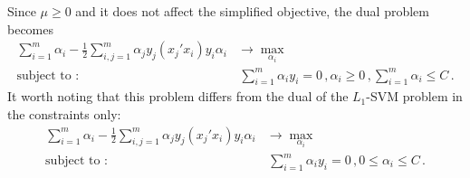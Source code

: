 \documentclass[a4paper]{article}
\begin{document}
Since $\mu \geq 0$ and it does not affect the simplified objective, the dual problem
becomes
\begin{align*}
  \sum_{i=1}^m \alpha_i - \frac{1}{2}
        \sum_{i,j=1}^m \alpha_j y_j (x_j'x_i) y_i \alpha_i
    &\to \max_{\alpha_i} \\
  \text{subject to :}\,
      &\,\sum_{i=1}^m \alpha_i y_i = 0
      \,,\alpha_i \geq 0
      \,,\sum_{i=1}^m \alpha_i \leq C \,.
\end{align*}
It worth noting that this problem differs from the dual of the $L_1$-SVM problem
in the constraints only:
\begin{align*}
  \sum_{i=1}^m \alpha_i - \frac{1}{2}
        \sum_{i,j=1}^m \alpha_j y_j (x_j'x_i) y_i \alpha_i
    &\to \max_{\alpha_i} \\
  \text{subject to :}\,
      &\,\sum_{i=1}^m \alpha_i y_i = 0
       \,,0 \leq \alpha_i \leq C \,.
\end{align*}



\end{document}
